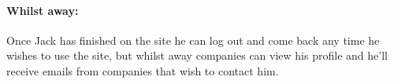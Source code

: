   \paragraph{Whilst away:}
    Once Jack has finished on the site he can log out and come back any time he wishes to use the site, but whilst away companies can view his profile and he'll receive emails from companies that wish to contact him.


